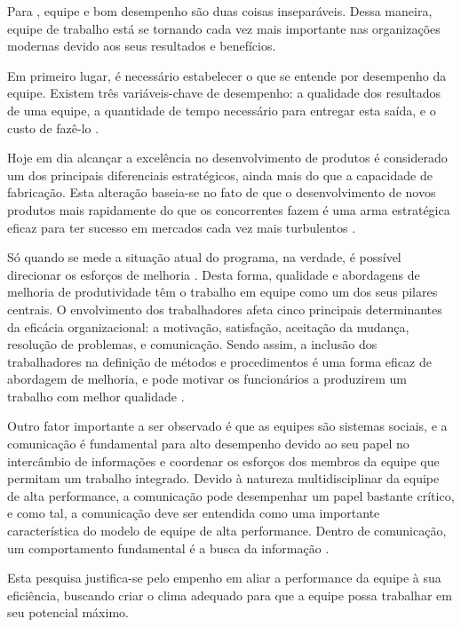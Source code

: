 \documentclass[
	12pt,
	openright,
	oneside, %
	a4paper,
	chapter=TITLE,
	section=TITLE,
	english,
	brazil %
	]{abntex2-udesc}
\begin{document}
Para , equipe e bom desempenho são duas coisas inseparáveis.
Dessa maneira, equipe de trabalho está se tornando cada vez mais importante nas
organizações modernas devido aos seus resultados e benefícios.

Em primeiro lugar, é necessário estabelecer o que se entende por desempenho da
equipe. Existem três variáveis-chave de desempenho: a qualidade dos resultados de uma
equipe, a quantidade de tempo necessário para entregar esta saída, e o custo de fazê-lo
\cite{crowder2012etal}.

Hoje em dia alcançar a excelência no desenvolvimento de produtos é considerado um
dos principais diferenciais estratégicos, ainda mais do que a capacidade de fabricação. Esta
alteração baseia-se no fato de que o desenvolvimento de novos produtos mais rapidamente do
que os concorrentes fazem é uma arma estratégica eficaz para ter sucesso em mercados cada
vez mais turbulentos \cite{tsiotras2014}.

Só quando se mede a situação atual do programa, na verdade, é possível direcionar os
esforços de melhoria \cite{tsiotras2014}. Desta forma, qualidade e abordagens de melhoria
de produtividade têm o trabalho em equipe como um dos seus pilares centrais. O
envolvimento dos trabalhadores afeta cinco principais determinantes da eficácia
organizacional: a motivação, satisfação, aceitação da mudança, resolução de problemas, e
comunicação. Sendo assim, a inclusão dos trabalhadores na definição de métodos e
procedimentos é uma forma eficaz de abordagem de melhoria, e pode motivar os funcionários
a produzirem um trabalho com melhor qualidade \cite{taveira2008}.

Outro fator importante a ser observado é que as equipes são sistemas sociais, e a
comunicação é fundamental para alto desempenho devido ao seu papel no intercâmbio de
informações e coordenar os esforços dos membros da equipe que permitam um trabalho
integrado. Devido à natureza multidisciplinar da equipe de alta performance, a comunicação
pode desempenhar um papel bastante crítico, e como tal, a comunicação deve ser entendida
como uma importante característica do modelo de equipe de alta performance. Dentro de
comunicação, um comportamento fundamental é a busca da informação \cite{crowder2012etal}.

Esta pesquisa justifica-se pelo empenho em aliar a performance da equipe à sua
eficiência, buscando criar o clima adequado para que a equipe possa trabalhar em seu
potencial máximo.
\end{document}
